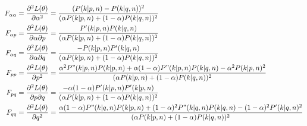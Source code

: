 \begin{align*}
F_{\alpha\alpha} &= \frac{\partial^2L(\mathbb{\theta})}{\partial\alpha^2} = \frac{(P(k | p, n) - P(k | q, n))^2}{(\alpha P(k | p, n) + (1 - \alpha) P(k | q, n))^2} \\
F_{\alpha p} &= \frac{\partial^2L(\mathbb{\theta})}{\partial\alpha\partial p} = \frac{P'(k | p, n)P(k | q, n)}{(\alpha P(k | p, n) + (1 - \alpha) P(k | q, n))^2} \\
F_{\alpha q} &= \frac{\partial^2L(\mathbb{\theta})}{\partial\alpha\partial q} = \frac{-P(k | p, n)P'(k | q, n)}{(\alpha P(k | p, n) + (1 - \alpha) P(k | q, n))^2} \\
F_{pp} &= \frac{\partial^2L(\mathbb{\theta})}{\partial p^2} = \frac{\alpha^2P"(k | p, n)P(k | p, n) + \alpha(1 - \alpha)P"(k | p, n)P(k | q, n) - \alpha^2P(k | p, n)^2}{(\alpha P(k | p, n) + (1 - \alpha) P(k | q, n))^2} \\
F_{pq} &= \frac{\partial^2L(\mathbb{\theta})}{\partial p\partial q} = \frac{-\alpha(1 - \alpha)P'(k | p, n)P'(k | p, n)}{(\alpha P(k | p, n) + (1 - \alpha) P(k | q, n))^2} \\
F_{qq} &= \frac{\partial^2L(\mathbb{\theta})}{\partial q^2} = \frac{\alpha(1 - \alpha)P"(k | q, n)P(k | p, n) + (1 - \alpha)^2P"(k | q, n)P(k | q, n) - (1 - \alpha)^2P'(k | q, n)^2}{(\alpha P(k | p, n) + (1 - \alpha) P(k | q, n))^2}
\end{align*}

